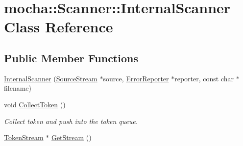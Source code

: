 \hypertarget{classmocha_1_1_scanner_1_1_internal_scanner}{
\section{mocha::Scanner::InternalScanner Class Reference}
\label{classmocha_1_1_scanner_1_1_internal_scanner}
}
\subsection*{Public Member Functions}
\begin{DoxyCompactItemize}
\item 
\hyperlink{classmocha_1_1_scanner_1_1_internal_scanner_ab5a808f27f0a4d37a03e90799aa14f7e}{InternalScanner} (\hyperlink{classmocha_1_1_source_stream}{SourceStream} $\ast$source, \hyperlink{classmocha_1_1_error_reporter}{ErrorReporter} $\ast$reporter, const char $\ast$filename)
\item 
void \hyperlink{classmocha_1_1_scanner_1_1_internal_scanner_a6214085467f18055556f5ab11021e975}{CollectToken} ()
\begin{DoxyCompactList}\small\item\em Collect token and push into the token queue. \end{DoxyCompactList}\item 
\hyperlink{classmocha_1_1_token_stream}{TokenStream} $\ast$ \hyperlink{classmocha_1_1_scanner_1_1_internal_scanner_a101cacbf57de03917498b52b3817886d}{GetStream} ()
\end{DoxyCompactItemize}
